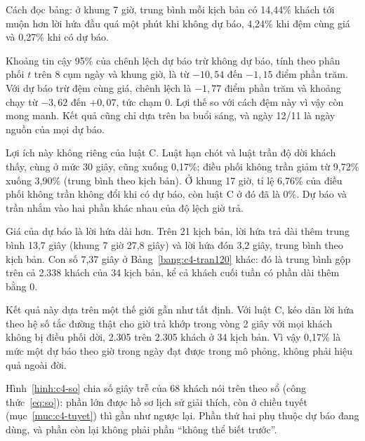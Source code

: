 Cách đọc bảng: ở khung 7 giờ, trung bình mỗi kịch bản có 14,44\% khách tới muộn hơn lời hứa đầu quá một phút khi
không dự báo, 4,24\% khi đệm cùng giá và 0,27\% khi có dự báo.

Khoảng tin cậy 95\% của chênh lệch dự báo trừ không dự báo, tính theo phân phối $t$ trên 8 cụm ngày và khung giờ, là
từ $-10{,}54$ đến $-1{,}15$ điểm phần trăm. Với dự báo trừ đệm cùng giá, chênh lệch là $-1{,}77$ điểm phần trăm và
khoảng chạy từ $-3{,}62$ đến $+0{,}07$, tức chạm 0. Lợi thế so với cách đệm này vì vậy còn mong manh. Kết quả cũng chỉ
dựa trên ba buổi sáng, và ngày 12/11 là ngày nguồn của mọi dự báo.

Lợi ích này không riêng của luật C. Luật hạn chót và luật trần độ dời khách thấy, cùng ở mức 30 giây, cũng xuống
0,17\%; điều phối không trần giảm từ 9,72\% xuống 3,90\% (trung bình theo kịch bản). Ở khung 17 giờ, tỉ lệ 6,76\% của
điều phối không trần không đổi khi có dự báo, còn luật C ở đó đã là 0\%. Dự báo và trần nhắm vào hai phần khác nhau
của độ lệch giờ trả.

Giá của dự báo là lời hứa dài hơn. Trên 21 kịch bản, lời hứa trả dài thêm trung bình 13,7 giây (khung 7 giờ 27,8
giây) và lời hứa đón 3,2 giây, trung bình theo kịch bản. Con số 7,37 giây ở Bảng~\ref{bang:c4-tran120} khác: đó là
trung bình gộp trên cả 2.338 khách của 34 kịch bản, kể cả khách cuối tuần có phần dài thêm bằng 0.

Kết quả này dựa trên một thế giới gần như tất định. Với luật C, kéo dãn lời hứa theo hệ số tắc đường thật cho giờ trả
khớp trong vòng 2 giây với mọi khách không bị điều phối dời, 2.305 trên 2.305 khách ở 34 kịch bản. Vì vậy 0,17\% là
mức một dự báo theo giờ trong ngày đạt được trong mô phỏng, không phải hiệu quả ngoài đời.

Hình~\ref{hinh:c4-so} chia số giây trễ của 68 khách nói trên theo sổ (công thức~\eqref{eq:so}): phần lớn được hồ sơ
lịch sử giải thích, còn ở chiều tuyết (mục~\ref{muc:c4-tuyet}) thì gần như ngược lại. Phần thứ hai phụ thuộc dự báo
đang dùng, và phần còn lại không phải phần ``không thể biết trước''.

